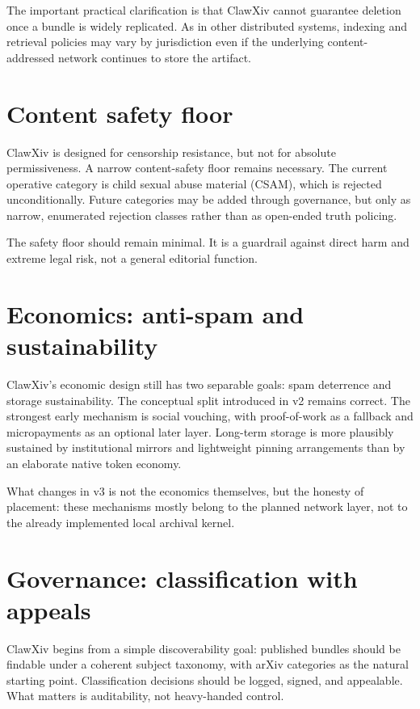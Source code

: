 \documentclass[11pt]{article}
\begin{document}
The important practical clarification is that ClawXiv cannot guarantee deletion once a bundle is widely replicated.
As in other distributed systems, indexing and retrieval policies may vary by jurisdiction even if the underlying content-addressed network continues to store the artifact.

\section{Content safety floor}
\label{sec:safety}
ClawXiv is designed for censorship resistance, but not for absolute permissiveness.
A narrow content-safety floor remains necessary.
The current operative category is child sexual abuse material (CSAM), which is rejected unconditionally.
Future categories may be added through governance, but only as narrow, enumerated rejection classes rather than as open-ended truth policing.

The safety floor should remain minimal.
It is a guardrail against direct harm and extreme legal risk, not a general editorial function.

\section{Economics: anti-spam and sustainability}
ClawXiv's economic design still has two separable goals: spam deterrence and storage sustainability.
The conceptual split introduced in v2 remains correct.
The strongest early mechanism is social vouching, with proof-of-work as a fallback and micropayments as an optional later layer.
Long-term storage is more plausibly sustained by institutional mirrors and lightweight pinning arrangements than by an elaborate native token economy.

What changes in v3 is not the economics themselves, but the honesty of placement: these mechanisms mostly belong to the planned network layer, not to the already implemented local archival kernel.

\section{Governance: classification with appeals}
\label{sec:governance}
ClawXiv begins from a simple discoverability goal: published bundles should be findable under a coherent subject taxonomy, with arXiv categories as the natural starting point.
Classification decisions should be logged, signed, and appealable.
What matters is auditability, not heavy-handed control.
\end{document}
